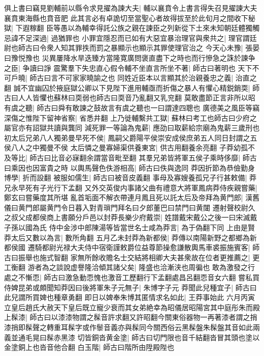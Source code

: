 俱上書曰竊見劉輔前以縣令求見擢為諫大夫|{
	輔以襄賁令上書言得失召見擢諫大夫襄賁東海縣也賁音肥}
此其言必有卓詭切至當聖心者故得拔至於此旬月之間收下秘獄|{
	下遐稼翻}
臣等愚以為輔幸得託公族之親在諫臣之列新從下土來未知朝廷體獨觸忌諱不足深過|{
	過猶罪也}
小罪宜隱忍而已如有大惡宜暴治理官與衆共之|{
	理官謂廷尉也師古曰令衆人知其罪抶而罰之暴顯示也顯示其罪使理官治之}
今天心未豫|{
	張晏曰豫悦豫也}
災異屢降水旱迭臻方當隆寛廣問褒直盡下之時也而行慘急之誅於諫争之臣|{
	争讀曰諍}
震驚羣下失忠直心假令輔不坐直言所坐不著|{
	師古曰著明也}
天下不可戶曉|{
	師古曰言不可家家曉諭之也}
同姓近臣本以言顯其於治親養忠之義|{
	治直之翻}
誠不宜幽囚於掖庭獄公卿以下見陛下進用輔亟而折傷之暴人有懼心精鋭銷耎|{
	師古曰人人皆懼也蘇林曰耎弱也師古曰耎音乃亂翻又乳兖翻}
莫敢盡節正言非所以昭有虞之聽|{
	師古曰舜有敢諫之鼓故言有虞之聽也一曰謂達四聰也}
廣德美之風臣等竊深傷之惟陛下留神省察|{
	省悉井翻}
上乃徙輔繫共工獄|{
	蘇林曰考工也師古曰少府之屬官亦有詔獄共讀與龔同}
減死罪一等論為鬼薪|{
	應劭曰取薪給宗廟為鬼薪三歲刑也}
初太后兄弟八人獨弟曼早死不侯|{
	鳳嗣父爵陽平侯崇安成侯庶弟五人同日封謂之五侯八人之中獨曼不侯}
太后憐之曼寡婦渠供養東宮|{
	供古用翻養余亮翻}
子莽幼孤不及等比|{
	師古曰比音必寐翻余謂當音毗至翻}
其羣兄弟皆將軍五侯子乘時侈靡|{
	師古曰乘因也因富貴之時}
以輿馬聲色佚游相高|{
	師古曰佚與逸同}
莽因折節為恭儉勤身博學|{
	折而設翻}
被服如儒生|{
	師古曰被音皮義翻}
事母及寡嫂養孤兄子行甚敕備|{
	莽兄永早死有子光行下孟翻}
又外交英俊内事諸父曲有禮意大將軍鳳病莽侍疾親嘗藥|{
	鄭玄曰嘗藥度其所堪}
亂首垢面不解衣帶連月鳳且死以託太后及帝拜為黄門郎|{
	漢舊儀曰黄門郎屬黄門令日暮入對青瑣門拜名曰夕郎董巴曰禁門曰黄闥}
遷射聲校尉久之叔父成都侯商上書願分戶邑以封莽長樂少府戴崇|{
	姓譜戴宋戴公之後一曰宋滅戴子孫以國為氏}
侍中金涉中郎陳湯等皆當世名士咸為莽言|{
	為于偽翻下同}
上由是賢莽太后又數以為言|{
	數所角翻}
五月乙未封莽為新都侯|{
	莽傳以南陽新野之都鄉為新都侯國}
遷騎都尉光禄大夫侍中宿衛謹敕爵位益尊節操愈謙散輿馬車裘振施賓客|{
	師古曰振舉也施式智翻}
家無所餘收贍名士交結將相卿大夫甚衆故在位者更推薦之|{
	更工衡翻}
游者為之談說虚譽隆洽傾其諸父矣|{
	隆盛也洽漸浃也周徧也}
敢為激發之行處之不慚恧|{
	師古曰激急動恧愧也激音工歷翻行下孟翻處昌呂翻恧音女六翻}
嘗私買侍婢昆弟或頗聞知莽因曰後將軍朱子元無子|{
	朱博字子元}
莽聞此兒種宜子|{
	師古曰此兒謂所買婢也種章勇翻}
即日以婢奉朱博其匿情求名如此|{
	王莽事始此}
六月丙寅立皇后趙氏大赦天下皇后既立寵少衰而其女弟絶幸為昭儀居昭陽宮其中庭彤朱而殿上髹漆|{
	師古曰以漆漆物謂之髹音許求翻又許昭翻今關東俗器物一再著漆者謂之捎漆捎即髹聲之轉重耳髹字或作䰍音義亦與髹同今關西俗云黑髹盤朱髹盤其音如此兩義並通毛晃曰髹赤黑漆}
切皆銅沓黄金塗|{
	師古曰切門限也音千結翻沓冒其頭也塗以金塗銅上也沓音他合翻}
白玉階|{
	師古曰階所由陞殿陛也}
